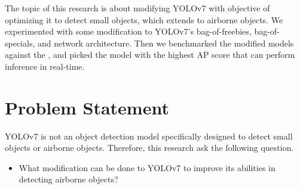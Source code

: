     The topic of this research is about modifying YOLOv7 with objective of optimizing it to detect
    small objects, which extends to airborne objects. We experimented with some modification to 
    YOLOv7's bag-of-freebies, bag-of-specials, and network architecture. Then we benchmarked the
    modified models against the \textcite{aot_dataset}, and picked the model with the highest AP score
    that can perform inference in real-time.






\section{Problem Statement}
    
    YOLOv7 is not an object detection model specifically designed to detect small objects or airborne objects.
    Therefore, this research ask the following question.
    \begin{itemize}
        \item What modification can be done to YOLOv7 to improve its abilities in detecting airborne objects?
    \end{itemize}

